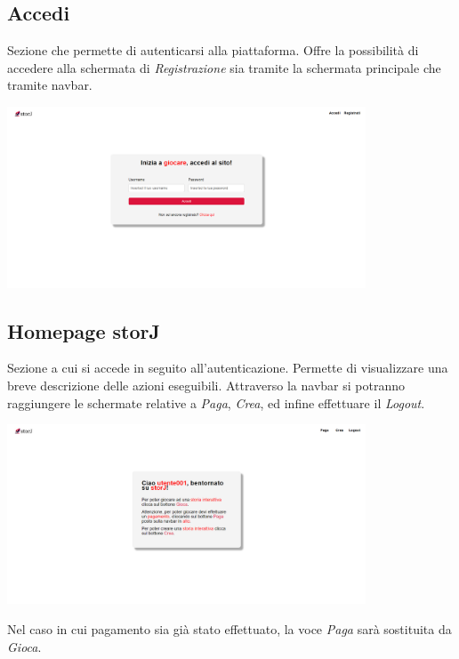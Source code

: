 \documentclass{article}
\begin{document}
\subsection*{Accedi}
Sezione che permette di autenticarsi alla piattaforma. Offre la possibilità di accedere alla schermata di \textit{Registrazione} sia tramite la schermata principale che tramite navbar.
\begin{center}
    \includegraphics[width=0.8\textwidth]{foto6.png}
\end{center}

\subsection*{Homepage storJ}
Sezione a cui si accede in seguito all'autenticazione. Permette di visualizzare una breve descrizione delle azioni eseguibili. Attraverso la navbar si potranno raggiungere le schermate relative a \textit{Paga}, \textit{Crea}, ed infine effettuare il \textit{Logout}.
\begin{center}
    \includegraphics[width=0.8\textwidth]{foto7.png}
\end{center}
Nel caso in cui pagamento sia già stato effettuato, la voce \textit{Paga} sarà sostituita da \textit{Gioca}.
\end{document}
